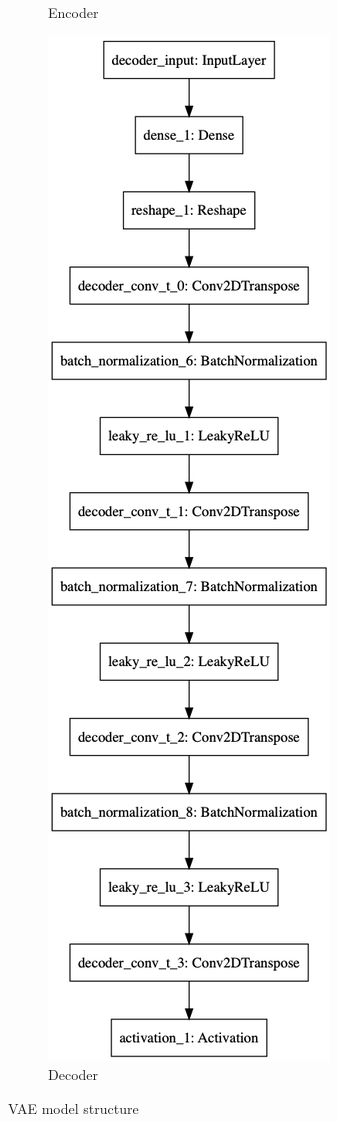 \begin{figure}
\begin{subfigure}{.5\textwidth}
        \caption{Encoder}
    \end{subfigure}%
    \begin{subfigure}{.5\textwidth}
        \centering
        \includegraphics[width=\textwidth,height=.85\textheight,keepaspectratio]{images/vae/decoder.png}
        \caption{Decoder}
    \end{subfigure}
    \caption{\ac{VAE} model structure}
    \label{fig:vae_model_structure}
\end{figure}

